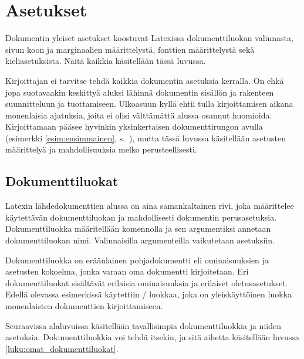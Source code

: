 
\chapter{Asetukset}

Dokumentin yleiset asetukset koostuvat Latexissa dokumenttiluokan
valinnasta, sivun koon ja marginaalien määrittelystä, fonttien
määrittelystä sekä kieliasetuksista. Näitä kaikkia käsitellään tässä
luvussa.

Kirjoittajan ei tarvitse tehdä kaikkia dokumentin asetuksia kerralla. On
ehkä jopa suotavaakin keskittyä aluksi lähinnä dokumentin sisällön ja
rakenteen suunnitteluun ja tuottamiseen. Ulkoasuun kyllä ehtii tulla
kirjoittamisen aikana monenlaisia ajatuksia, joita ei olisi välttämättä
alussa osannut huomioida. Kirjoittamaan pääsee hyvinkin yksinkertaisen
dokumenttirungon avulla (esimerkki \ref{esim:ensimmainen},
s.~\pageref{esim:ensimmainen}), mutta tässä luvussa käsitellään
asetusten määrittelyä ja mahdollisuuksia melko perusteellisesti.

\section{Dokumenttiluokat}
\label{luku:dokumenttiluokat}

Latexin lähdedokumenttien alussa on aina samankaltainen rivi, joka
määrittelee käytettävän dokumenttiluokan ja mahdollisesti dokumentin
perusasetuksia. Dokumenttiluokka määritellään komennolla
 ja sen argumentiksi annetaan dokumenttiluokan
nimi. Valinnaisilla argumenteilla vaikutetaan asetuksiin.


Dokumenttiluokka on eräänlainen pohjadokumentti eli ominaisuuksien ja
asetusten kokoelma, jonka varaan oma dokumentti kirjoitetaan. Eri
dokumenttiluokat sisältävät erilaisia ominaisuuksia ja erilaiset
oletusasetukset. Edellä olevassa esimerkissä käytettiin
\-/ luokkaa, joka on yleiskäyttöinen luokka monenlaisten
dokumenttien kirjoittamiseen.

Seuraavissa alaluvuissa käsitellään tavallisimpia dokumenttiluokkia ja
niiden asetuksia. Dokumenttiluokkia voi tehdä itsekin, ja sitä aihetta
käsitellään luvussa \ref{luku:omat_dokumenttiluokat}.

